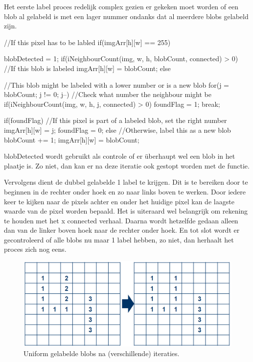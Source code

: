 Het eerste label proces redelijk complex gezien er gekeken moet worden of een
blob al gelabeld is met een lager nummer ondanks dat al meerdere blobs gelabeld
zijn.

\begin{cppcode}
//If this pixel has to be labled
if(imgArr[h][w] == 255){
  blobDetected = 1;
  if(iNeighbourCount(img, w, h, blobCount, connected) > 0){ //If this blob is labeled
      imgArr[h][w] = blobCount;
  } else { //This blob might be labeled with a lower number or is a new blob
      for(j = blobCount; j != 0; j--){ //Check what number the neighbour might be
          if(iNeighbourCount(img, w, h, j, connected) > 0){
              foundFlag = 1;
              break;
          }
      }

      if(foundFlag){ //If this pixel is part of a labeled blob, set the right number
          imgArr[h][w] = j;
          foundFlag = 0;
      } else { //Otherwise, label this as a new blob
          blobCount += 1;
          imgArr[h][w] = blobCount;
      }

  }
}
\end{cppcode}
blobDetected wordt gebruikt als controle of er überhaupt wel een blob in het
plaatje is. Zo niet, dan kan er na deze iteratie ook gestopt worden met de
functie.

Vervolgens dient de dubbel gelabelde 1 label te krijgen. Dit is te bereiken
door te beginnen in de rechter onder hoek en zo naar links boven te werken.
Door iedere keer te kijken naar de pixels achter en onder het huidige pixel
kan de laagste waarde van de pixel worden bepaald. Het is uiteraard wel
belangrijk om rekening te houden met het x connected verhaal.
Daarna wordt hetzelfde gedaan alleen dan van de linker boven hoek naar de
rechter onder hoek. En tot slot wordt er gecontroleerd of alle blobs nu
maar 1 label hebben, zo niet, dan herhaalt het proces zich nog eens.

\begin{figure}
    \begin{center}
        \includegraphics[scale=0.4]{figures/label_blobs_step2.png}
    \end{center}
    \caption{Uniform gelabelde blobs na (verschillende) iteraties.}
    \label{fig:lbstep2}
\end{figure}

